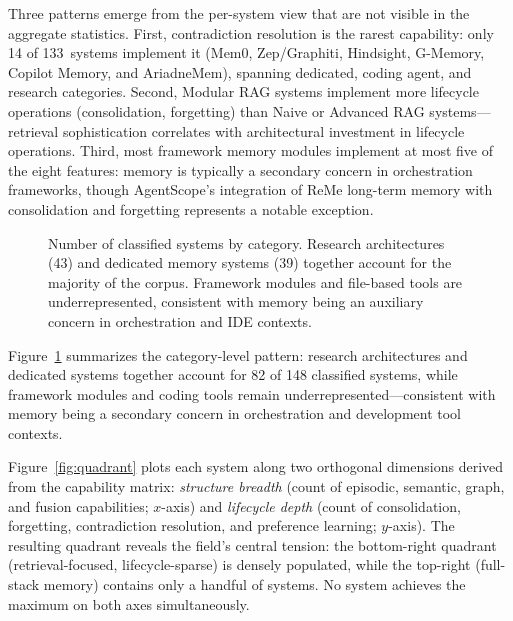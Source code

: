 Three patterns emerge from the per-system view that are not visible in the
aggregate statistics.  First, contradiction resolution is the rarest
capability: only 14 of 133~systems implement it (Mem0, Zep/Graphiti,
Hindsight, G-Memory, Copilot Memory, and AriadneMem), spanning dedicated,
coding agent, and research categories.
Second, Modular RAG systems implement more lifecycle operations
(consolidation, forgetting) than Naive or Advanced RAG systems---retrieval
sophistication correlates with architectural investment in lifecycle
operations.  Third, most framework memory modules implement at most five of the
eight features: memory is typically a secondary concern in orchestration
frameworks, though AgentScope's integration of ReMe long-term memory with
consolidation and forgetting represents a notable exception.

\begin{figure}[!t]
\centering
{}
\caption{Number of classified systems by category.  Research architectures (43)
and dedicated memory systems (39) together account for the majority of the
corpus.  Framework modules and file-based tools are underrepresented,
consistent with memory being an auxiliary concern in orchestration and IDE
contexts.}
\label{fig:category-scores}
\end{figure}

Figure~\ref{fig:category-scores} summarizes the category-level pattern:
research architectures and dedicated systems together account for 82 of
148 classified systems, while framework modules and coding tools remain
underrepresented---consistent with memory being a secondary concern in
orchestration and development tool contexts.

Figure~\ref{fig:quadrant} plots each system along two orthogonal dimensions
derived from the capability matrix: \emph{structure breadth} (count of
episodic, semantic, graph, and fusion capabilities; $x$-axis) and
\emph{lifecycle depth} (count of consolidation, forgetting, contradiction
resolution, and preference learning; $y$-axis).  The resulting quadrant
reveals the field's central tension: the bottom-right quadrant
(retrieval-focused, lifecycle-sparse) is densely populated, while the
top-right (full-stack memory) contains only a handful of systems.
No system achieves the maximum on both axes simultaneously.


